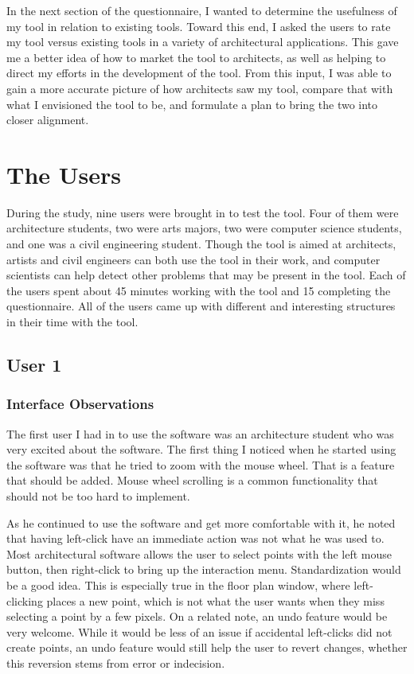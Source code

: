 \documentclass{thesis}
\begin{document}
In the next section of the questionnaire, I wanted to determine the usefulness of my tool in relation to existing tools.  Toward
this end, I asked the users to rate my tool versus existing tools in a variety of architectural applications.  This gave me a
better idea of how to market the tool to architects, as well as helping to direct my efforts in the development of the tool.
From this input, I was able to gain a more accurate picture of how architects saw my tool, compare that with what I
envisioned the tool to be, and formulate a plan to bring the two into closer alignment.

\section{The Users}
During the study, nine users were brought in to test the tool.  Four of them were architecture students, two were arts majors, two
were computer science students, and one was a civil engineering student.  Though the tool is aimed at architects, artists and civil
engineers can both use the tool in their work, and computer scientists can help detect other problems that may be present in the tool.
Each of the users spent about 45 minutes working with the tool and 15 completing the questionnaire.  All of the users came up with
different and interesting structures in their time with the tool.

\subsection{User 1}
\subsubsection{Interface Observations}
The first user I had in to use the software was an architecture student who was very excited about the software.
The first thing I noticed when he started using the software was that he tried to zoom with the mouse wheel.  That is a feature that
should be added.  Mouse wheel scrolling is a common functionality that should not be too hard to implement.

As he continued to use the software and get more comfortable with it, he noted that having left-click have an immediate action was not
what he was used to. Most architectural software allows the user to select points with the left mouse button, then right-click to
bring up the interaction menu.  Standardization would be a good idea.  This is especially true in the floor plan window, where
left-clicking places a new point, which is not what the user wants when they miss selecting a point by a few pixels.  On a related
note, an undo feature would be very welcome.  While it would be less of an issue if accidental left-clicks did not create points,
an undo feature would still help the user to revert changes, whether this reversion stems from error or indecision.
\end{document}
